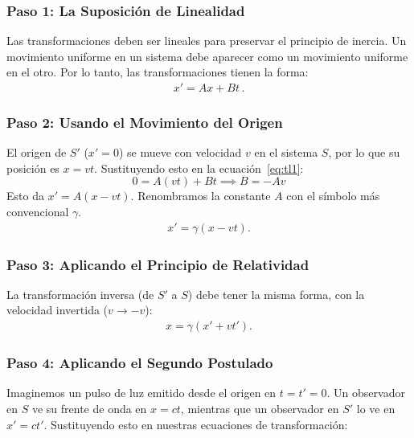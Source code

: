 \documentclass[11pt,a4paper]{article}
\begin{document}
\subsubsection{Paso 1: La Suposición de Linealidad}

Las transformaciones deben ser lineales para preservar el principio de inercia. Un movimiento uniforme en un sistema debe aparecer como un movimiento uniforme en el otro. Por lo tanto, las transformaciones tienen la forma:
\begin{align}
\label{eq:tl1}
 x' = Ax + Bt\,.   
\end{align}
 
\subsubsection{Paso 2: Usando el Movimiento del Origen}

El origen de $S'$ ($x'=0$) se mueve con velocidad $v$ en el sistema $S$, por lo que su posición es $x=vt$. Sustituyendo esto en la ecuación~\eqref{eq:tl1}:
\[ 0 = A(vt) + Bt \implies B = -Av \]
Esto da $x' = A(x-vt)$. Renombramos la constante $A$ con el símbolo más convencional $\gamma$.
\begin{align}
\label{eq:xplt}
x' = \gamma (x - vt).    
\end{align}

\subsubsection{Paso 3: Aplicando el Principio de Relatividad}

La transformación inversa (de $S'$ a $S$) debe tener la misma forma, con la velocidad invertida ($v \to -v$):
\begin{align}
\label{eq:invxplt}
    x = \gamma (x' + vt').
\end{align}

\subsubsection{Paso 4: Aplicando el Segundo Postulado}
Imaginemos un pulso de luz emitido desde el origen en $t=t'=0$. Un observador en $S$ ve su frente de onda en $x=ct$, mientras que un observador en $S'$ lo ve en $x'=ct'$. Sustituyendo esto en nuestras ecuaciones de transformación:

\end{document}
